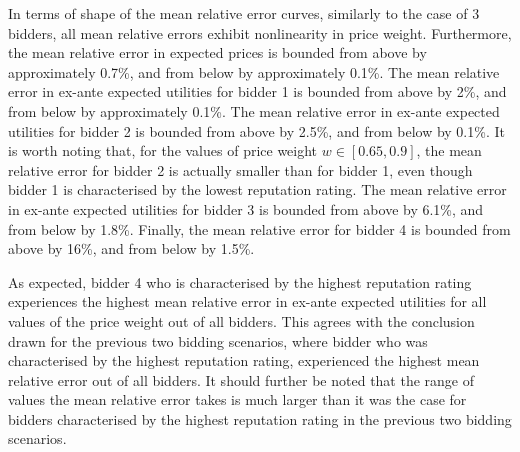 In terms of shape of the mean relative error curves, similarly to the case of 3 bidders, all mean relative errors exhibit nonlinearity in price weight. Furthermore, the mean relative error in expected prices is bounded from above by approximately 0.7\%, and from below by approximately 0.1\%. The mean relative error in ex-ante expected utilities for bidder 1 is bounded from above by 2\%, and from below by approximately 0.1\%. The mean relative error in ex-ante expected utilities for bidder 2 is bounded from above by 2.5\%, and from below by 0.1\%. It is worth noting that, for the values of price weight $w\in [0.65, 0.9]$, the mean relative error for bidder 2 is actually smaller than for bidder 1, even though bidder 1 is characterised by the lowest reputation rating. The mean relative error in ex-ante expected utilities for bidder 3 is bounded from above by 6.1\%, and from below by 1.8\%. Finally, the mean relative error for bidder 4 is bounded from above by 16\%, and from below by 1.5\%.

As expected, bidder 4 who is characterised by the highest reputation rating experiences the highest mean relative error in ex-ante expected utilities for all values of the price weight out of all bidders. This agrees with the conclusion drawn for the previous two bidding scenarios, where bidder who was characterised by the highest reputation rating, experienced the highest mean relative error out of all bidders. It should further be noted that the range of values the mean relative error takes is much larger than it was the case for bidders characterised by the highest reputation rating in the previous two bidding scenarios.

